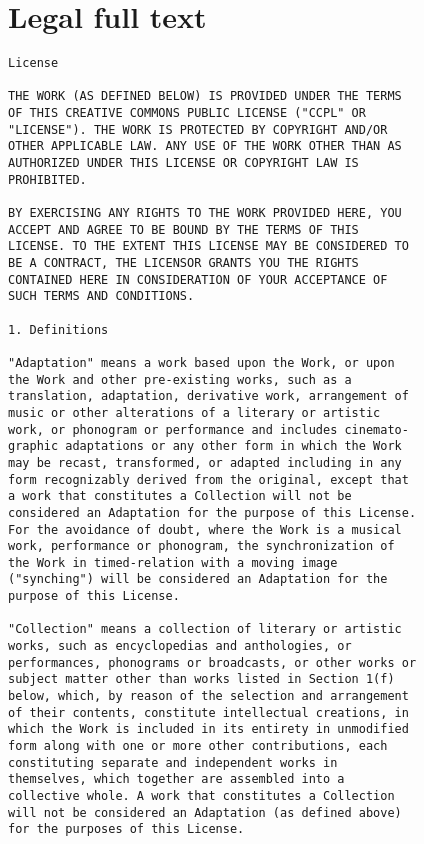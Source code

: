 \section{Legal full text}
\label{sec-license-fulltext}

\begin{verbatim}
License

THE WORK (AS DEFINED BELOW) IS PROVIDED UNDER THE TERMS
OF THIS CREATIVE COMMONS PUBLIC LICENSE ("CCPL" OR
"LICENSE"). THE WORK IS PROTECTED BY COPYRIGHT AND/OR
OTHER APPLICABLE LAW. ANY USE OF THE WORK OTHER THAN AS
AUTHORIZED UNDER THIS LICENSE OR COPYRIGHT LAW IS
PROHIBITED.

BY EXERCISING ANY RIGHTS TO THE WORK PROVIDED HERE, YOU
ACCEPT AND AGREE TO BE BOUND BY THE TERMS OF THIS
LICENSE. TO THE EXTENT THIS LICENSE MAY BE CONSIDERED TO
BE A CONTRACT, THE LICENSOR GRANTS YOU THE RIGHTS
CONTAINED HERE IN CONSIDERATION OF YOUR ACCEPTANCE OF
SUCH TERMS AND CONDITIONS.

1. Definitions

"Adaptation" means a work based upon the Work, or upon
the Work and other pre-existing works, such as a
translation, adaptation, derivative work, arrangement of
music or other alterations of a literary or artistic
work, or phonogram or performance and includes cinemato-
graphic adaptations or any other form in which the Work
may be recast, transformed, or adapted including in any
form recognizably derived from the original, except that
a work that constitutes a Collection will not be
considered an Adaptation for the purpose of this License.
For the avoidance of doubt, where the Work is a musical
work, performance or phonogram, the synchronization of
the Work in timed-relation with a moving image
("synching") will be considered an Adaptation for the
purpose of this License.

"Collection" means a collection of literary or artistic
works, such as encyclopedias and anthologies, or
performances, phonograms or broadcasts, or other works or
subject matter other than works listed in Section 1(f)
below, which, by reason of the selection and arrangement
of their contents, constitute intellectual creations, in
which the Work is included in its entirety in unmodified
form along with one or more other contributions, each
constituting separate and independent works in
themselves, which together are assembled into a
collective whole. A work that constitutes a Collection
will not be considered an Adaptation (as defined above)
for the purposes of this License.


\end{verbatim}

